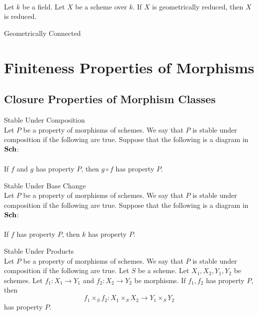 \documentclass[a4paper]{article}
\begin{document}
\begin{prp}{}{}\\
Let $k$ be a field. Let $X$ be a scheme over $k$. If $X$ is geometrically reduced, then $X$ is reduced. 
\end{prp}

\begin{defn}{Geometrically Connected}{}
\end{defn}

\pagebreak
\section{Finiteness Properties of Morphisms}
\subsection{Closure Properties of Morphism Classes}
\begin{defn}{Stable Under Composition}{}\\
Let $P$ be a property of morphisms of schemes. We say that $P$ is stable under composition if the following are true. Suppose that the following is a diagram in $\bold{Sch}$: \\
\\
If $f$ and $g$ has property $P$, then $g\circ f$ has property $P$. 
\end{defn}

\begin{defn}{Stable Under Base Change}{}\\
Let $P$ be a property of morphisms of schemes. We say that $P$ is stable under composition if the following are true. Suppose that the following is a diagram in $\bold{Sch}$: \\
\\
If $f$ has property $P$, then $k$ has property $P$. 
\end{defn}

\begin{defn}{Stable Under Products}{}\\
Let $P$ be a property of morphisms of schemes. We say that $P$ is stable under composition if the following are true. Let $S$ be a scheme. Let $X_1,X_2,Y_1,Y_2$ be schemes. Let $f_1:X_1\to Y_1$ and $f_2:X_2\to Y_2$ be morphisms. If $f_1,f_2$ has property $P$, then $$f_1\times_Sf_2:X_1\times_SX_2\to Y_1\times_SY_2$$ has property $P$. 
\end{defn}
\end{document}
